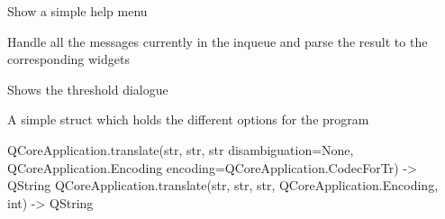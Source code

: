 \documentclass[letterpaper,10pt,english]{sphinxmanual}
\begin{document}
\begin{fulllineitems}
\begin{fulllineitems}
\end{fulllineitems}


\begin{fulllineitems}
\label{muonic:muonic.gui.MainWindow.MainWindow.help_menu}
Show a simple help menu

\end{fulllineitems}


\begin{fulllineitems}
\label{muonic:muonic.gui.MainWindow.MainWindow.processIncoming}
Handle all the messages currently in the inqueue 
and parse the result to the corresponding widgets

\end{fulllineitems}


\begin{fulllineitems}
\label{muonic:muonic.gui.MainWindow.MainWindow.threshold_menu}
Shows the threshold dialogue

\end{fulllineitems}


\end{fulllineitems}


\begin{fulllineitems}
\label{muonic:muonic.gui.MainWindow.MuonicOptions}
A simple struct which holds the different
options for the program

\end{fulllineitems}


\begin{fulllineitems}
\label{muonic:muonic.gui.MainWindow.tr}
QCoreApplication.translate(str, str, str disambiguation=None, QCoreApplication.Encoding encoding=QCoreApplication.CodecForTr) -\textgreater{} QString
QCoreApplication.translate(str, str, str, QCoreApplication.Encoding, int) -\textgreater{} QString

\end{fulllineitems}
\end{document}

